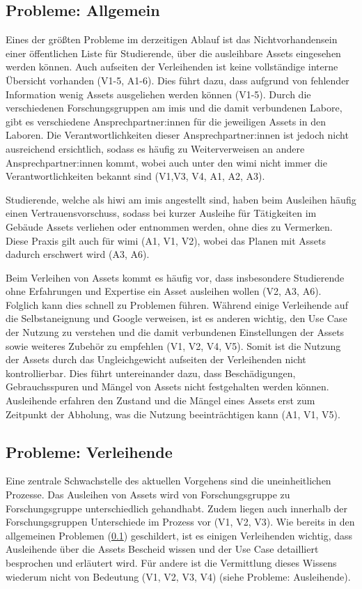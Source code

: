 \subsection{Probleme: Allgemein}
\label{section:probleme-allgemein}
Eines der größten Probleme im derzeitigen Ablauf ist das Nichtvorhandensein einer öffentlichen Liste
für Studierende, über die ausleihbare Assets eingesehen werden können. Auch aufseiten der
Verleihenden ist keine vollständige interne Übersicht vorhanden (V1-5, A1-6). Dies führt dazu, dass
aufgrund von fehlender Information wenig Assets ausgeliehen werden können (V1-5). Durch die verschiedenen
Forschungsgruppen am \ac{imis} und die damit verbundenen Labore, gibt es verschiedene
Ansprechpartner:innen für die jeweiligen Assets in den Laboren. Die Verantwortlichkeiten dieser
Ansprechpartner:innen ist jedoch nicht ausreichend ersichtlich, sodass es häufig zu Weiterverweisen
an andere Ansprechpartner:innen kommt, wobei auch unter den \ac{wimi} nicht immer
die Verantwortlichkeiten bekannt sind (V1,V3, V4, A1, A2, A3).

Studierende, welche als \ac{hiwi} am \ac{imis} angestellt sind, haben beim Ausleihen häufig einen
Vertrauensvorschuss, sodass bei kurzer Ausleihe für Tätigkeiten im Gebäude Assets verliehen oder
entnommen werden, ohne dies zu Vermerken. Diese Praxis gilt auch für \ac{wimi} (A1, V1, V2), wobei
das Planen mit Assets dadurch erschwert wird (A3, A6).

Beim Verleihen von Assets kommt es häufig vor, dass insbesondere Studierende ohne Erfahrungen und
Expertise ein Asset ausleihen wollen (V2, A3, A6). Folglich kann dies schnell zu Problemen führen.
Während einige Verleihende auf die Selbstaneignung und Google verweisen, ist es anderen wichtig, den
Use Case der Nutzung zu verstehen und die damit verbundenen Einstellungen der Assets sowie weiteres
Zubehör zu empfehlen (V1, V2, V4, V5). Somit ist die Nutzung der Assets durch das Ungleichgewicht
aufseiten der Verleihenden nicht kontrollierbar. Dies führt untereinander dazu, dass Beschädigungen,
Gebrauchsspuren und Mängel von Assets nicht festgehalten werden können. Ausleihende erfahren den
Zustand und die Mängel eines Assets erst zum Zeitpunkt der Abholung, was die Nutzung beeinträchtigen
kann (A1, V1, V5).

\subsection{Probleme: Verleihende}
\label{section:probleme-verleihende}
Eine zentrale Schwachstelle des aktuellen Vorgehens sind die uneinheitlichen Prozesse. Das Ausleihen
von Assets wird von Forschungsgruppe zu Forschungsgruppe unterschiedlich gehandhabt. Zudem liegen
auch innerhalb der Forschungsgruppen Unterschiede im Prozess vor (V1, V2, V3). Wie bereits in den
allgemeinen Problemen (\ref{section:probleme-allgemein}) geschildert, ist es einigen Verleihenden
wichtig, dass Ausleihende über die Assets Bescheid wissen und der Use Case detailliert besprochen
und erläutert wird. Für andere ist die Vermittlung dieses Wissens wiederum nicht von Bedeutung
(V1, V2, V3, V4) (siehe Probleme: Ausleihende).

